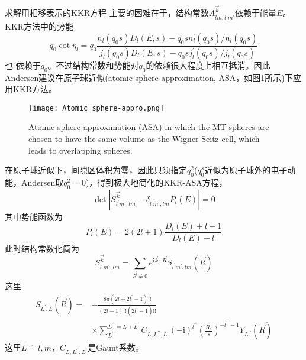 求解用相移表示的KKR方程
主要的困难在于，结构常数$A_{lm,l^{\prime}m^{\prime}}^{\vec k}$依赖于能量$E$。KKR方法中的势能
\begin{equation}
  q_0\cot\eta_l=q_0\dfrac{n_l(q_0s)D_l(E,s)-q_0sn_l^{\prime}(q_0s)/n_l(q_0s)}{j_l(q_0s)D_l(E,s)-q_0sj_l^{\prime}(q_0s)/j_l(q_0s)}
  \label{eq:solid-134}
\end{equation}
也%
依赖于$q_0$。不过结构常数和势能对$q_0$的依赖很大程度上相互抵消\cite{PRB5-3894_1972,SSC11-395_1972,PRL27-1211_1971}。因此Andersen建议在原子球近似(atomic sphere approximation, ASA，如图\ref{Atomic_sphere-appro}所示)下应用KKR方法\cite{SSC13-133_1973}。
\begin{figure}[h!]
\centering
\texttt{[image: Atomic\_sphere-appro.png]}
\caption{\small \textrm{Atomic sphere approximation (ASA) in which the MT spheres are chosen to have the same volume as the Wigner-Seitz cell, which leads to overlapping spheres.}}
\label{Atomic_sphere-appro}
\end{figure}
在原子球近似下，间隙区体积为零，因此只须指定$q_0^2$($q_0^s$近似为原子球外的电子动能，Andersen取$q_0^2=0$)，得到极大地简化的KKR-ASA方程，
\begin{equation}
  \det|S_{l^{\prime}m^{\prime},lm}^{\vec k}-\delta_{l^{\prime}m^{\prime},lm}P_l(E)|=0
  \label{eq:solid-135}
\end{equation}
其中势能函数为
\begin{equation}
  P_l(E)=2(2l+1)\frac{D_l(E)+l+1}{D_l(E)-l}
  \label{eq:solid-136}
\end{equation}
此时结构常数化简为
\begin{equation}
	S_{l^{\prime}m^{\prime},lm}^{\vec k}=\sum_{\vec R\neq0}e^{\mathrm{i}\vec k\cdot\vec R}S_{l^{\prime}m^{\prime},lm}(\vec R)
  \label{eq:solid-137}
\end{equation}
这里
\begin{equation}
  \begin{split}
    S_{L^{\prime},L}(\vec R)=&-\frac{8\pi(2l+2l^{\prime}-1)!!}{(2l-1)!!(2l^{\prime}-1)!!}\\
    &\times\sum_{L^{\prime\prime}}^{L^{\prime\prime}=L+L^{\prime}}C_{L,L^{\prime\prime},L^{\prime}}(-\mathrm{i})^{l^{\prime\prime}}\left(\frac{R_s}s\right)^{-l^{\prime\prime}-1}Y_{L^{\prime\prime}}(\vec R)
  \end{split}
  \label{eq:solid-138}
\end{equation}
这里$L\hat=l,m$，$C_{L,L^{\prime\prime},L^{\prime}}$是Gaunt系数。%

